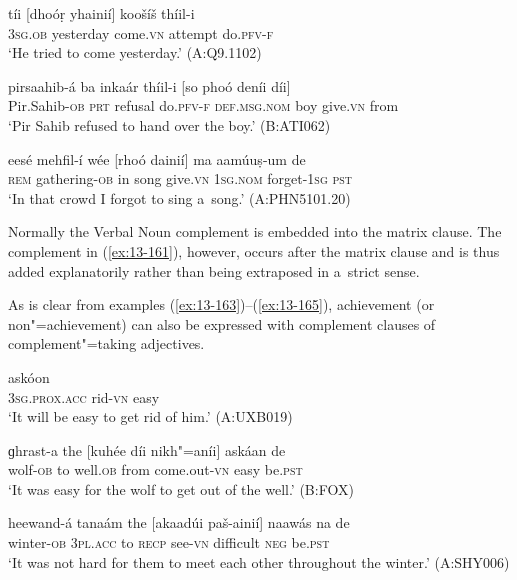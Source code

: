 \begin{exe}
\ex
\label{ex:13-160}
\gll tíi [dhoóṛ yhainií] koošíš thíil-i \\
\textsc{3sg.ob} yesterday come.\textsc{vn} attempt do.\textsc{pfv-f} \\
\glt `He tried to come yesterday.' (A:Q9.1102)

\ex
\label{ex:13-161}
\gll pirsaahib-á ba inkaár thíil-i [so phoó  deníi díi] \\
Pir.Sahib-\textsc{ob} \textsc{prt} refusal do.\textsc{pfv-f} \textsc{def.msg.nom} boy  give.\textsc{vn} from \\
\glt `Pir Sahib refused to hand over the boy.' (B:ATI062)

\ex
\label{ex:13-162}
\gll eesé mehfil-í wée [rhoó dainií] ma  aamúuṣ-um de \\
\textsc{rem} gathering-\textsc{ob} in song give.\textsc{vn} \textsc{1sg.nom} forget-\textsc{1sg} \textsc{pst} \\
\glt `In that crowd I forgot to sing a~song.' (A:PHN5101.20) 
\end{exe}

Normally the Verbal Noun complement is embedded into the matrix clause. The complement in (\ref{ex:13-161}), however, occurs after the matrix clause and is thus added explanatorily rather than being extraposed in a~strict sense.


As is clear from examples (\ref{ex:13-163})--(\ref{ex:13-165}), achievement (or non"=achievement) can also be expressed with complement clauses of complement"=taking adjectives.

\begin{exe}
\ex
\label{ex:13-163}
\gll [nis phus"=ainií] askóon \\
\textsc{3sg.prox.acc} rid-\textsc{vn} easy \\
\glt `It will be easy to get rid of him.' (A:UXB019)

\ex
\label{ex:13-164}
\gll ɡhrast-a the [kuhée díi nikh"=aníi] askáan de  \\
wolf-\textsc{ob} to well.\textsc{ob} from come.out-\textsc{vn} easy be.\textsc{pst}  \\
\glt `It was easy for the wolf to get out of the well.' (B:FOX)

\ex
\label{ex:13-165}
\gll heewand-á tanaám the [akaadúi paš-ainií] naawás  na de \\
winter-\textsc{ob} \textsc{3pl.acc} to \textsc{recp} see-\textsc{vn} difficult \textsc{neg} be.\textsc{pst} \\
\glt `It was not hard for them to meet each other throughout the winter.' (A:SHY006) 
\end{exe}

